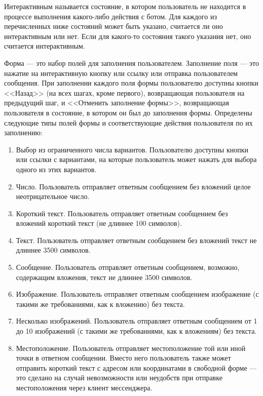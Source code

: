     Интерактивным называется состояние, в котором пользователь не находится в процессе выполнения
    какого-либо действия с ботом. Для каждого из перечисленных ниже состояний может быть указано,
    считается ли оно интерактивным или нет. Если для какого-то состояния такого указания нет,
    оно считается интерактивным.

    Форма --- это набор полей для заполнения пользователем.  Заполнение поля --- это нажатие на
    интерактивную кнопку или ссылку или отправка пользователем сообщения. При заполнении
    каждого поля формы пользователю доступны кнопки <<Назад>> (на всех шагах, кроме первого),
    возвращающая пользователя на предыдущий шаг, и <<Отменить заполнение формы>>, возвращающая
    пользователя в состояние, в котором он был до заполнения формы. Определены следующие типы
    полей формы и соответствующие действия пользователя по их заполнению:
    \begin{enumerate}
        \item
            Выбор из ограниченного числа вариантов.
            Пользователю доступны кнопки или ссылки с вариантами, на которые пользователь может нажать
            для выбора одного из этих вариантов.
        \item
            Число.
            Пользователь отправляет ответным сообщением без вложений целое неотрицательное число.
        \item
            Короткий текст.
            Пользователь отправляет ответным сообщением без вложений короткий текст (не длиннее 100 символов).
        \item
            Текст.
            Пользователь отправляет ответным сообщением без вложений текст не длиннее 3500 символов.
        \item
            Сообщение.
            Пользователь отправляет ответным сообщением, возможно, содержащим вложения, текст не длиннее 3500
            символов.
        \item
            Изображение.
            Пользователь отправляет ответным сообщением изображение (с такими же требованиями, как к вложению)
            без текста.
        \item
            Несколько изображений.
            Пользователь отправляет ответным сообщением от 1 до 10 изображений
            (с такими же требованиями, как к вложениям)
            без текста.
        \item
            Местоположение.
            Пользователь отправляет местоположение той или иной точки в ответном сообщении.
            Вместо него пользователь также может отправить короткий текст с адресом или координатами в
            свободной форме --- это сделано на случай невозможности или неудобств при отправке
            местоположения через клиент мессенджера.
    \end{enumerate}
